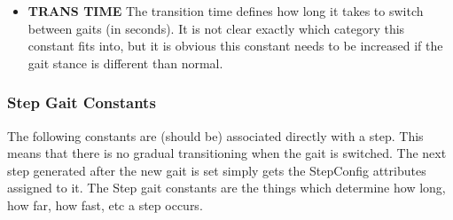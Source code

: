 \documentclass[11pt]{article}
\begin{document}
\begin{itemize}
\item {\bf TRANS TIME} The transition time defines how long it takes to switch
between gaits (in seconds). It is not clear exactly which category this
constant fits into, but it is obvious this constant needs to be increased
if the gait stance is different than normal.
\end{itemize}

\subsubsection{Step Gait Constants}
The following constants are (should be) associated directly with a step.
This means that there is no gradual transitioning when the gait is switched.
The next step generated after the new gait is set simply gets the StepConfig
attributes assigned to it.  The Step gait constants are the things which
determine how long, how far, how fast, etc a step occurs.
\end{document}
